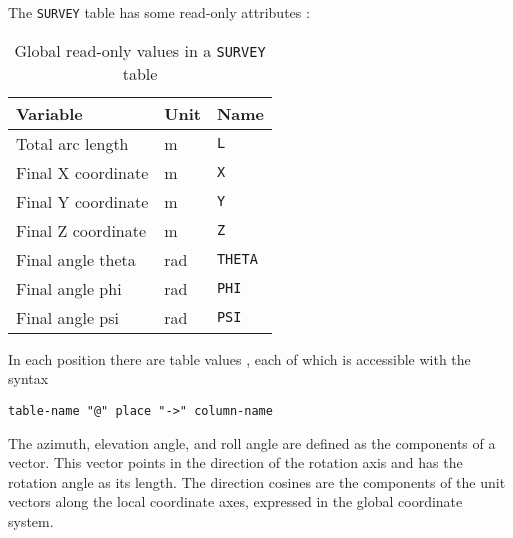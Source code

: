 The \texttt{SURVEY} table has some read-only attributes :
\begin{table}[Ht] \footnotesize
  \begin{center}
    \caption{Global read-only values in a \texttt{SURVEY} table}
    \label{tab:survey_glob}
    \begin{tabular}{|l|l|l|}
      \hline
      Variable & Unit & Name \\
      \hline
      Total arc length & m & \texttt{L}\index{L} \\
      Final X coordinate & m & \texttt{X}\index{X} \\
      Final Y coordinate & m & \texttt{Y}\index{Y} \\
      Final Z coordinate & m & \texttt{Z}\index{Z} \\
      Final angle theta & rad & \texttt{THETA}\index{THETA} \\
      Final angle phi & rad & \texttt{PHI}\index{PHI} \\
      Final angle psi & rad & \texttt{PSI}\index{PSI} \\
      \hline
    \end{tabular}
  \end{center}
\end{table}

In each position there are table values ,
each of which is accessible with the syntax 
\begin{verbatim}
table-name "@" place "->" column-name
\end{verbatim}
The azimuth, elevation angle, and roll angle are defined as the
components of a vector.
This vector points in the direction of the rotation axis and has the
rotation angle as its length.
The direction cosines are the components of the unit vectors along the
local coordinate axes, expressed in the global coordinate system.


